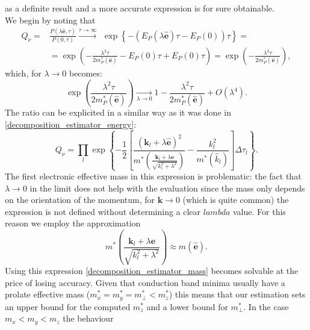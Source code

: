 as a definite result and a more accurate expression is for sure obtainable.\\
We begin by noting that
\begin{equation}
\begin{split}
    Q_\nu=&\frac{P(\lambda\hat{\mathbf{e}},\tau)}{P(0,\tau)}\xrightarrow[]{\tau\to\infty}\hspace{5pt}\exp{\left\{-\left(E_P(\lambda\hat{\mathbf{e}})\tau-E_P(0)\right)\tau\right\}}=\\
    &=\exp{\left(-\frac{\lambda^2\tau}{2m^*_P(\hat{\mathbf{e}})}-E_P(0)\tau+E_P(0)\tau\right)}=\exp{\left(-\frac{\lambda^2\tau}{2m^*_P(\hat{\mathbf{e}})}\right)},
\end{split}
\end{equation}
which, for $\lambda\to 0$ becomes:
\begin{equation}
    \exp{\left(\frac{\lambda^2\tau}{2m^*_P(\hat{\mathbf{e}})}\right)}\xrightarrow[\lambda\to 0]{}1-\frac{\lambda^2\tau}{2m^*_P(\hat{\mathbf{e}})}+O(\lambda^4).
    \label{effective_mass_taylor}
\end{equation}
The ratio can be explicited in a similar way as it was done in \ref{decomposition_estimator_energy}:
\begin{equation}
    Q_\nu=\prod_l\exp\left\{-\frac{1}{2}\left[\frac{(\mathbf{k}_l+\lambda\hat{\mathbf{e}})^2}{m^*\left({\frac{\mathbf{k}_l+\lambda\mathbf{e}}{\sqrt{k^2_l+\lambda^2}}}\right)}-\frac{k^2_l}{m^*(\hat{k}_l)}\right]\Delta\tau_l\right\}.
    \label{decomposition_estimator_mass}
\end{equation}
The first electronic effective mass in this expression is problematic: the fact that $\lambda\to 0$ in the limit does not help with the evaluation since the mass only depends on the orientation of 
the momentum, for $\mathbf{k}\to 0$ (which is quite common) the expression is not defined without determining a clear $lambda$ value. For this reason 
we employ the approximation
\begin{equation}
    m^*\left({\frac{\mathbf{k}_l+\lambda\mathbf{e}}{\sqrt{k^2_l+\lambda^2}}}\right)\approx m(\hat{\mathbf{e}}).
    \label{effective_mass_approx}
\end{equation}
Using this expression \ref{decomposition_estimator_mass} becomes solvable at the price of losing accuracy. Given that conduction band minima usually have a prolate effective mass 
($m^*_x=m^*_y=m^*_{\perp}<m^*_z$) this means that our estimation sets an upper bound for the computed $m^*_z$ and a lower bound for $m^*_\perp$. In the case $m_x<m_y<m_z$ the behaviour 
